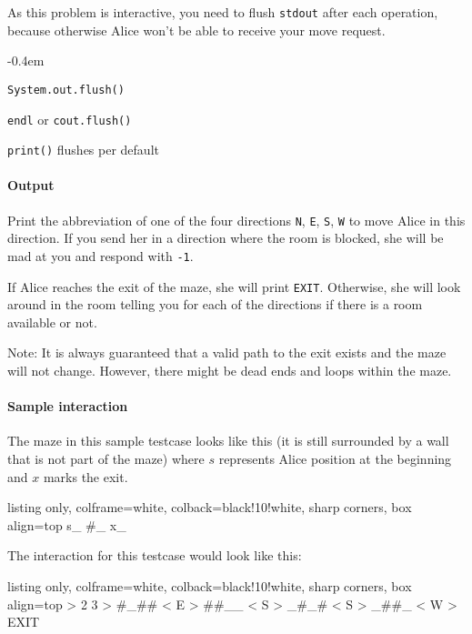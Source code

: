 As this problem is interactive, you need to flush \texttt{stdout} after each operation, because otherwise Alice won't be able to receive your move request.
\begin{description}
	\itemsep-0.4em
	\item[Java:] \texttt{System.out.flush()}
	\item[C++:] \texttt{endl} or \texttt{cout.flush()}
  \item[Python] \texttt{print()} flushes per default
\end{description}

\paragraph*{Output}

Print the abbreviation of one of the four directions \texttt{N}, \texttt{E}, \texttt{S}, \texttt{W} to move Alice in this direction. If you send her in a direction where the room is blocked, she will be mad at you and respond with \texttt{-1}.

If Alice reaches the exit of the maze, she will print \texttt{EXIT}. Otherwise, she will look around in the room telling you for each of the directions if there is a room available or not.

Note: It is always guaranteed that a valid path to the exit exists and the maze will not change. However, there might be dead ends and loops within the maze.

\paragraph*{Sample interaction}

The maze in this sample testcase looks like this (it is still surrounded by a wall that is not part of the maze) where $s$ represents Alice position at the beginning and $x$ marks the exit.

\noindent\begin{tcblisting}{listing only, colframe=white, colback=black!10!white, sharp corners, box align=top}
s_
#_
x_
\end{tcblisting}

The interaction for this testcase would look like this:

\noindent\begin{tcblisting}{listing only, colframe=white, colback=black!10!white, sharp corners, box align=top}
> 2 3
> #_##
< E
> ##__
< S
> _#_#
< S
> _##_
< W
> EXIT
\end{tcblisting}


